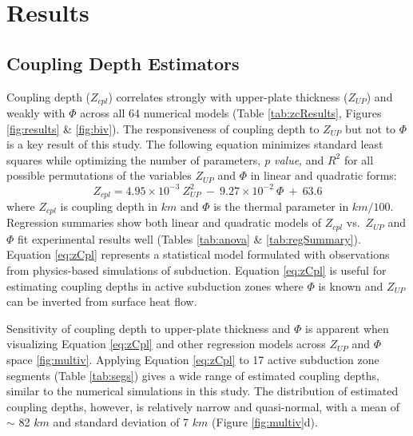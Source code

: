 \hypertarget{chpt2Results}{%
\section{Results}\label{chpt2Results}}

\hypertarget{cdEstimators}{%
\subsection{Coupling Depth Estimators}\label{cdEstimators}}

Coupling depth (\(Z_{cpl}\)) correlates strongly with upper-plate thickness (\(Z_{UP}\)) and weakly with \(\Phi\) across all 64 numerical models (Table \ref{tab:zcResults}, Figures \ref{fig:results} \& \ref{fig:biv}). The responsiveness of coupling depth to \(Z_{UP}\) but not to \(\Phi\) is a key result of this study. The following equation minimizes standard least squares while optimizing the number of parameters, \emph{p value}, and \(R^2\) for all possible permutations of the variables \(Z_{UP}\) and \(\Phi\) in linear and quadratic forms:
\begin{equation}
  Z_{cpl} = 4.95\times 10^{-3}\ Z_{UP}^{2}\ -\ 9.27\times 10^{-2}\ \Phi\ +\ 63.6
  \label{eq:zCpl}
\end{equation}
where \(Z_{cpl}\) is coupling depth in \(km\) and \(\Phi\) is the thermal parameter in \(km/100\). Regression summaries show both linear and quadratic models of \(Z_{cpl}\) vs.~\(Z_{UP}\) and \(\Phi\) fit experimental results well (Tables \ref{tab:anova} \& \ref{tab:regSummary}). Equation \eqref{eq:zCpl} represents a statistical model formulated with observations from physics-based simulations of subduction. Equation \eqref{eq:zCpl} is useful for estimating coupling depths in active subduction zones where \(\Phi\) is known and \(Z_{UP}\) can be inverted from surface heat flow.

Sensitivity of coupling depth to upper-plate thickness and \(\Phi\) is apparent when visualizing Equation \eqref{eq:zCpl} and other regression models across \(Z_{UP}\) and \(\Phi\) space \ref{fig:multiv}. Applying Equation \eqref{eq:zCpl} to 17 active subduction zone segments (Table \ref{tab:segs}) gives a wide range of estimated coupling depths, similar to the numerical simulations in this study. The distribution of estimated coupling depths, however, is relatively narrow and quasi-normal, with a mean of \(\sim\) 82 \(km\) and standard deviation of 7 \(km\) (Figure \ref{fig:multiv}d).

